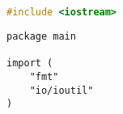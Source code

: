 \documentclass{book}
\begin{document}



\begin{lstlisting}[language=C++, caption={Cpp Testing}]
#include <iostream>
\end{lstlisting}


\begin{lstlisting}[caption={Golang Program}]
package main

import (
	"fmt"
	"io/ioutil"
)
\end{lstlisting}


\end{document}
